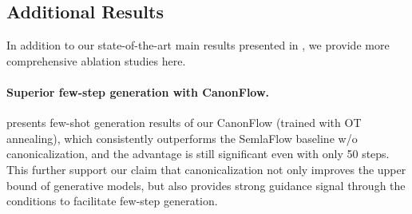 \documentclass{article}
\theoremstyle{plain}
\theoremstyle{definition}
\theoremstyle{remark}
\newcommand{\1}{\mathbf{1}}
\begin{document}
\subsection{Additional Results}

In addition to our state-of-the-art main results presented in , we provide more comprehensive ablation studies here.

\paragraph{Superior few-step generation with CanonFlow.}  presents few-shot generation results of our CanonFlow (trained with OT annealing), which consistently outperforms the SemlaFlow baseline w/o canonicalization, and the advantage is still significant even with only 50 steps. This further support our claim that canonicalization not only improves the upper bound of generative models, but also provides strong guidance signal through the conditions to facilitate few-step generation.
\end{document}
